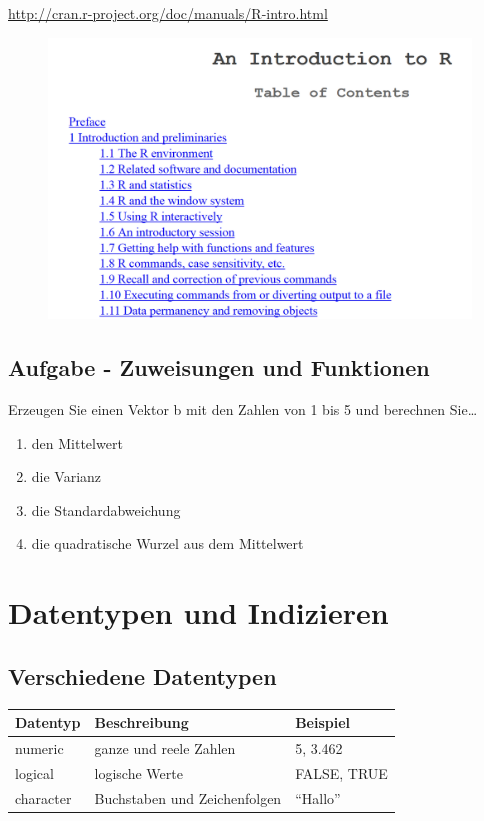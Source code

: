 \documentclass[]{article}
\begin{document}
\url{http://cran.r-project.org/doc/manuals/R-intro.html}

\begin{figure}[htbp]
\centering
\includegraphics{figure/UebersichtBefehle.PNG}
\caption{}
\end{figure}

\subsection{Aufgabe - Zuweisungen und
Funktionen}\label{aufgabe---zuweisungen-und-funktionen}

Erzeugen Sie einen Vektor b mit den Zahlen von 1 bis 5 und berechnen
Sie\ldots{}

\begin{enumerate}
\def\labelenumi{\arabic{enumi}.}
\item
  den Mittelwert
\item
  die Varianz
\item
  die Standardabweichung
\item
  die quadratische Wurzel aus dem Mittelwert
\end{enumerate}

\section{Datentypen und Indizieren}\label{datentypen-und-indizieren}

\subsection{Verschiedene Datentypen}\label{verschiedene-datentypen}

\begin{longtable}[]{@{}lll@{}}
\toprule
Datentyp & Beschreibung & Beispiel\tabularnewline
\midrule
\endhead
numeric & ganze und reele Zahlen & 5, 3.462\tabularnewline
logical & logische Werte & FALSE, TRUE\tabularnewline
character & Buchstaben und Zeichenfolgen & ``Hallo''\tabularnewline
\bottomrule
\end{longtable}
\end{document}
